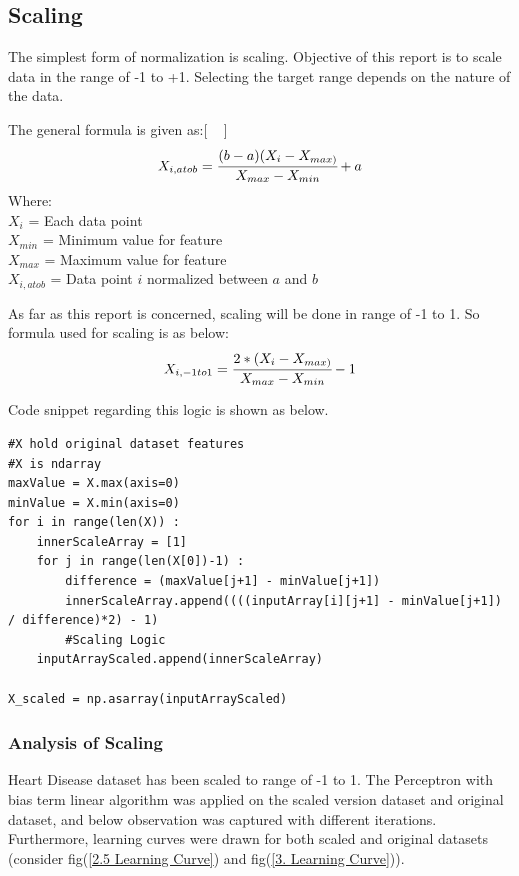 \documentclass{article}
\begin{document}
\subsection{Scaling}
The simplest form of normalization is scaling. Objective of this report is to scale data in the range of -1 to +1. Selecting the target range depends on the nature of the data. \\
\par The general formula is given as:[ ~\citep{Online3} ]
\begin{equation} 
X_{i,a to b} = \cfrac{(b - a) (X_i - X_{max)}}{X_{max} - X_{min}} + a
\end{equation}
Where:\\
\(X_i\) = Each data point\\
\(X_{min}\) = Minimum value for feature\\
\(X_{max}\) = Maximum value for feature\\
\(X_{i,a to b}\) = Data point \(i\) normalized between \(a\) and \(b\)\\
\par As far as this report is concerned, scaling will be done in range of -1 to 1. So formula used for scaling is as below:
\begin{equation} 
X_{i,-1 to 1} = \cfrac{2 * (X_i - X_{max)}}{X_{max} - X_{min}} - 1
\end{equation}
\par Code snippet regarding this logic is shown as below.
\begin{lstlisting}
#X hold original dataset features
#X is ndarray
maxValue = X.max(axis=0)
minValue = X.min(axis=0)
for i in range(len(X)) :
    innerScaleArray = [1]
    for j in range(len(X[0])-1) :
        difference = (maxValue[j+1] - minValue[j+1])
        innerScaleArray.append((((inputArray[i][j+1] - minValue[j+1]) / difference)*2) - 1)
        #Scaling Logic
    inputArrayScaled.append(innerScaleArray)
    
X_scaled = np.asarray(inputArrayScaled)
\end{lstlisting}
\subsubsection{Analysis of Scaling}
Heart Disease dataset has been scaled to range of -1 to 1. The Perceptron with bias term linear algorithm was applied on the scaled version dataset and original dataset, and below observation was captured with different iterations. Furthermore, learning curves were drawn for both scaled and original datasets (consider fig(\ref{2.5 Learning Curve}) and fig(\ref{3. Learning Curve})). 
\end{document}
